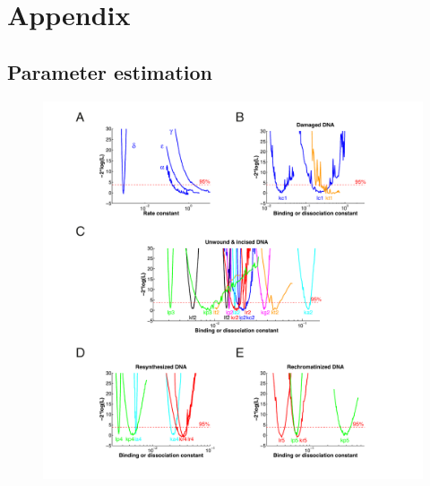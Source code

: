 \appendix
\chapter{Appendix}
\pagestyle{plain}


\section{Parameter estimation}


\begin{figure}[h!]
\begin{center}
\includegraphics[width=1\textwidth]{Abbildungen/figure_A_1.pdf}
\caption{\textbf{} }
\label{fig:profileLikilihoods}
\end{center}
\end{figure}


